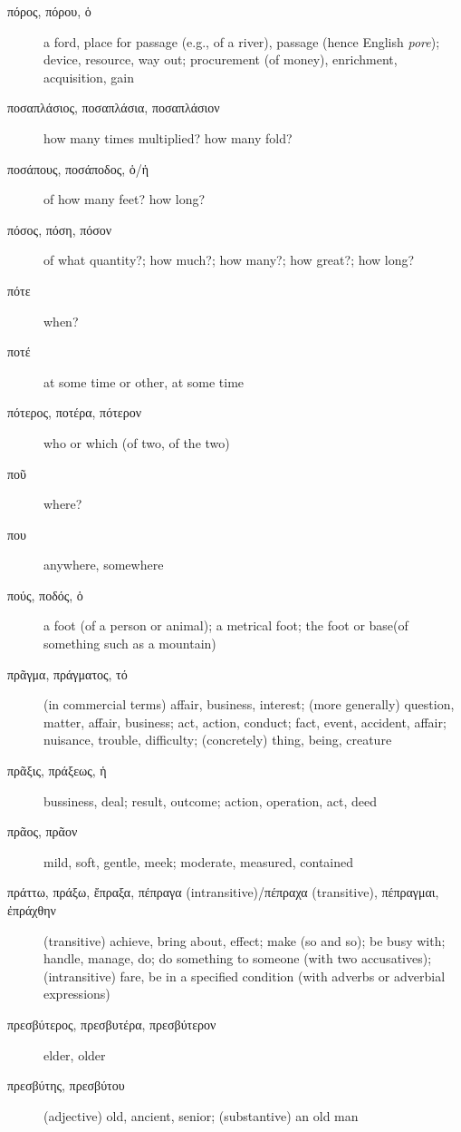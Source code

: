 \documentclass[12pt,letterpaper]{article}
\begin{document}
\begin{description}
    \item[\textgreek{πόρος, πόρου, ὁ}] a ford, place for passage (e.g., of a river), passage (hence English \textit{pore}); device, resource, way out; procurement (of money), enrichment, acquisition, gain
    \item[\textgreek{ποσαπλάσιος, ποσαπλάσια, ποσαπλάσιον}] how many times multiplied? how many fold?
    \item[\textgreek{ποσάπους, ποσάποδος, ὁ/ἡ}] of how many feet? how long?
    \item[\textgreek{πόσος, πόση, πόσον}] of what quantity?; how much?; how many?; how great?; how long?
    \item[\textgreek{πότε}] \marginnote{*}when?
    \item[\textgreek{ποτέ}] \marginnote{*}at some time or other, at some time
    \item[\textgreek{πότερος, ποτέρα, πότερον}] \marginnote{*}who or which (of two, of the two)
    \item[\textgreek{ποῦ}] \marginnote{*}where?
    \item[\textgreek{που}] \marginnote{*}anywhere, somewhere
    \item[\textgreek{πούς, ποδός, ὁ}] \marginnote{*}a foot (of a person or animal); a metrical foot; the foot or base(of something such as a mountain)
    \item[\textgreek{πρᾶγμα, πράγματος, τό}] \marginnote{*}(in commercial terms) affair, business, interest; (more generally) question, matter, affair, business; act, action, conduct; fact, event, accident, affair; nuisance, trouble, difficulty; (concretely) thing, being, creature
    \item[\textgreek{πρᾶξις, πράξεως, ἡ}] \marginnote{*}bussiness, deal; result, outcome; action, operation, act, deed
    \item[\textgreek{πρᾶος, πρᾶον}] mild, soft, gentle, meek; moderate, measured, contained
    \item[\textgreek{πράττω, πράξω, ἔπραξα, πέπραγα (intransitive)/πέπραχα (transitive), πέπραγμαι, ἐπράχθην}] (transitive) achieve, bring about, effect; make (so and so); be busy with; handle, manage, do; do something to someone (with two accusatives); (intransitive) fare, be in a specified condition (with adverbs or adverbial expressions)
    \item[\textgreek{πρεσβύτερος, πρεσβυτέρα, πρεσβύτερον}] \marginnote{*}elder, older
    \item[\textgreek{πρεσβύτης, πρεσβύτου}] (adjective) old, ancient, senior; (substantive) an old man

\end{description}
\end{document}
